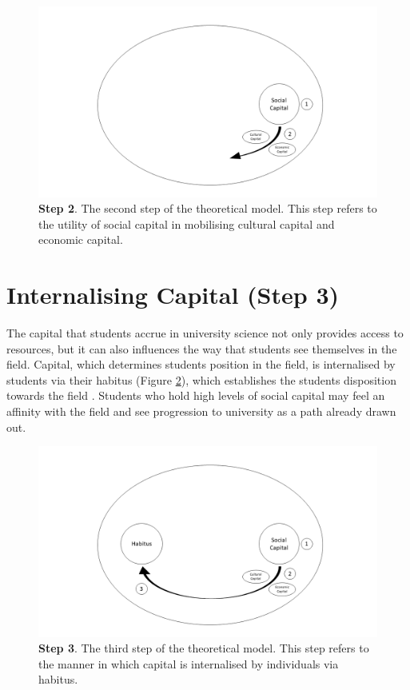 \begin{figure}[ht]
\centering
\includegraphics[width=\textwidth]{C5 - Understanding Capital Accumulation/HabitusSocCap_TheoreticalModel2.png}
\caption{\label{fig:TheoreticalModel2_C5}\textbf{Step 2}. The second step of the theoretical model. This step refers to the utility of social capital in mobilising cultural capital and economic capital.}
\end{figure}


\section{Internalising Capital (Step 3)}
The capital that students accrue in university science not only provides access to resources, but it can also influences the way that students see themselves in the field. Capital, which determines students position in the field, is internalised by students via their habitus  (Figure \ref{fig:TheoreticalModel3_C5}), which establishes the students disposition towards the field \cite{Bourdieu1992}. Students who hold high levels of social capital may feel an affinity with the field and see progression to university as a path already drawn out.

\begin{figure}[ht]
\centering
\includegraphics[width=\textwidth]{C5 - Understanding Capital Accumulation/HabitusSocCap_TheoreticalModel3.png}
\caption{\label{fig:TheoreticalModel3_C5}\textbf{Step 3}. The third step of the theoretical model. This step refers to the manner in which capital is internalised by individuals via habitus.}
\end{figure}



